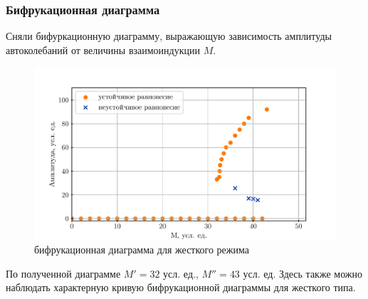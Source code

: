 \subsubsection{Бифрукационная диаграмма}
Сняли бифуркационную диаграмму, выражающую зависимость амплитуды автоколебаний от величины взаимоиндукции $M$.
\begin{figure}[h]
	\centering
	\vspace{-10pt}
	\includegraphics[]{plots/harddiagram.pdf}
	\caption{бифрукационная диаграмма для жесткого режима}
	\label{fig7}
\end{figure}
По полученной диаграмме $M'=32$ усл. ед., $M''=43$ усл. ед. Здесь также можно наблюдать характерную кривую бифрукационной диаграммы для жесткого типа.
